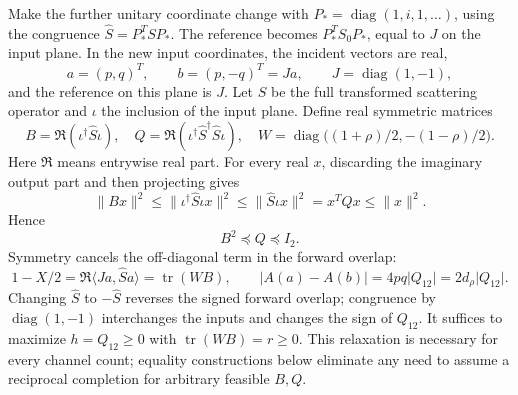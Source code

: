\documentclass[11pt,a4paper]{article}
\theoremstyle{remark}
\newcommand{\norm}[1]{\lVert #1\rVert}
\newcommand{\abs}[1]{\lvert #1\rvert}
\newcommand{\ip}[2]{\langle #1,#2\rangle}
\newcommand{\tr}{\operatorname{tr}}
\newcommand{\diag}{\operatorname{diag}}
\begin{document}
Make the further unitary coordinate change with $P_*=\diag(1,i,1,\ldots)$, using the congruence $\widehat S=P_*^TSP_*$. The reference becomes $P_*^TS_0P_*$, equal to $J$ on the input plane. In the new input coordinates, the incident vectors are real,
\[
 a=(p,q)^T,\qquad b=(p,-q)^T=J a,\qquad J=\diag(1,-1),
\]
and the reference on this plane is $J$. Let $\widehat S$ be the full transformed scattering operator and $\iota$ the inclusion of the input plane. Define real symmetric matrices
\begin{equation}\label{eq:compression}
 B=\Re(\iota^\dagger\widehat S\iota),\quad
 Q=\Re(\iota^\dagger\widehat S^\dagger\widehat S\iota),\quad
 W=\diag\bigl((1+\rho)/2,-(1-\rho)/2\bigr).
\end{equation}
Here $\Re$ means entrywise real part. For every real $x$, discarding the imaginary output part and then projecting gives
\[
 \norm{Bx}^2\leq\norm{\iota^\dagger\widehat S\iota x}^2
 \leq\norm{\widehat S\iota x}^2=x^TQx\leq\norm x^2.
\]
Hence
\begin{equation}\label{eq:relaxation}
 B^2\preceq Q\preceq I_2.
\end{equation}
Symmetry cancels the off-diagonal term in the forward overlap:
\[
 1-X/2=\Re\ip{Ja}{\widehat Sa}=\tr(WB),\qquad
 \abs{A(a)-A(b)}=4pq\abs{Q_{12}}=2d_\rho\abs{Q_{12}}.
\]
Changing $\widehat S$ to $-\widehat S$ reverses the signed forward overlap; congruence by $\diag(1,-1)$ interchanges the inputs and changes the sign of $Q_{12}$. It suffices to maximize $h=Q_{12}\geq0$ with $\tr(WB)=r\geq0$. This relaxation is necessary for every channel count; equality constructions below eliminate any need to assume a reciprocal completion for arbitrary feasible $B,Q$.
\end{document}
